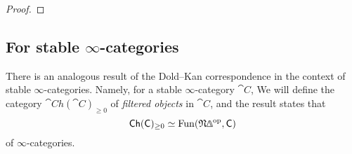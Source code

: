 \begin{proof}
    \nyw
\end{proof}

\subsection{For stable \texorpdfstring{$\infty$}{∞}-categories}

There is an analogous result of the Dold--Kan correspondence
in the context of stable $\infty$-categories.
Namely, for a stable $\infty$-category $\cat{C}$,
We will define the category $\cat{Ch}(\cat{C})_{\geq0}$ of \emph{filtered objects}
in $\cat{C}$, and the result states that
\[ \cat{Ch}(\cat{C})_{\geq0}\simeq\operatorname{Fun}(\mathfrak N\bfDelta\op,\cat{C}) \]
of $\infty$-categories.

